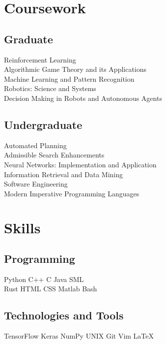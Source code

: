 \documentclass[]{deedy-resume}
\begin{document}
\begin{minipage}[t]{0.33\textwidth}

\section{Coursework}
\subsection{Graduate}
Reinforcement Learning \\
Algorithmic Game Theory and its Applications \\
Machine Learning and Pattern Recognition \\
Robotics: Science and Systems \\
Decision Making in Robots and Autonomous Agents \\
\sectionsep

\subsection{Undergraduate}
Automated Planning \\
Admissible Search Enhancements \\
Neural Networks: Implementation and Application \\
Information Retrieval and Data Mining \\
Software Engineering \\
Modern Imperative Programming Languages \\
\sectionsep


\section{Skills}
\subsection{Programming}
Python \textbullet{} C++ \textbullet{} C \textbullet{} Java \textbullet{} SML
\ \vspace{0.3em} \\
Rust \textbullet{} HTML \textbullet{} CSS \textbullet{} Matlab \textbullet{} Bash \\
\sectionsep

\subsection{Technologies and Tools}
TensorFlow \textbullet{} Keras \textbullet{} NumPy \textbullet{} UNIX \textbullet{} Git \textbullet{} Vim \textbullet{} \LaTeX

%
%

\end{minipage} 
\end{document}
